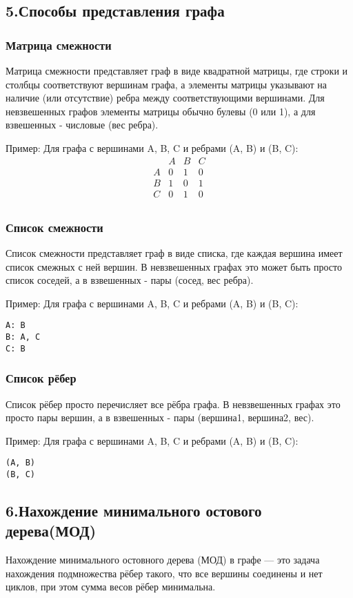 \documentclass{article}
\begin{document}
\pagebreak

\subsection*{5.Способы представления графа}
\subsubsection*{Матрица смежности}
Матрица смежности представляет граф в виде квадратной матрицы, где строки и столбцы соответствуют вершинам графа, а элементы матрицы указывают на наличие (или отсутствие) ребра между соответствующими вершинами. Для невзвешенных графов элементы матрицы обычно булевы (0 или 1), а для взвешенных - числовые (вес ребра).

Пример:
Для графа с вершинами A, B, C и ребрами (A, B) и (B, C):
\[
\begin{array}{c|ccc}
  & A & B & C \\
\hline
A & 0 & 1 & 0 \\
B & 1 & 0 & 1 \\
C & 0 & 1 & 0 \\
\end{array}
\]

\subsubsection*{Список смежности}
Список смежности представляет граф в виде списка, где каждая вершина имеет список смежных с ней вершин. В невзвешенных графах это может быть просто список соседей, а в взвешенных - пары (сосед, вес ребра).

Пример:
Для графа с вершинами A, B, C и ребрами (A, B) и (B, C):
\begin{verbatim}
A: B
B: A, C
C: B
\end{verbatim}

\subsubsection*{Список рёбер}
Список рёбер просто перечисляет все рёбра графа. В невзвешенных графах это просто пары вершин, а в взвешенных - пары (вершина1, вершина2, вес).

Пример:
Для графа с вершинами A, B, C и ребрами (A, B) и (B, C):
\begin{verbatim}
(A, B)
(B, C)
\end{verbatim}
\pagebreak

\subsection*{6.Нахождение минимального остового дерева(МОД)}
Нахождение минимального остовного дерева (МОД) в графе — это задача нахождения подмножества рёбер такого, что все вершины соединены и нет циклов, при этом сумма весов рёбер минимальна.
\end{document}
